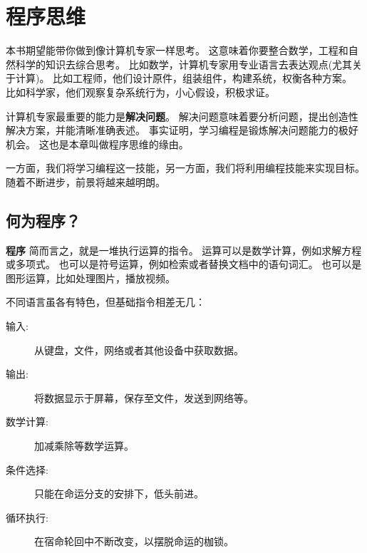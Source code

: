 \documentclass[10pt]{book}
\begin{document}
\begin{latexonly}

\tableofcontents

\clearemptydoublepage

\end{latexonly}

\mainmatter

\chapter{程序思维}

本书期望能带你做到像计算机专家一样思考。
这意味着你要整合数学，工程和自然科学的知识去综合思考。
比如数学，计算机专家用专业语言去表达观点(尤其关于计算)。
比如工程师，他们设计原件，组装组件，构建系统，权衡各种方案。
比如科学家，他们观察复杂系统行为，小心假设，积极求证。

计算机专家最重要的能力是{\bf 解决问题}。
解决问题意味着要分析问题，提出创造性解决方案，并能清晰准确表述。
事实证明，学习编程是锻炼解决问题能力的极好机会。
这也是本章叫做程序思维的缘由。
 
一方面，我们将学习编程这一技能，另一方面，我们将利用编程技能来实现目标。
随着不断进步，前景将越来越明朗。

\section{何为程序？}

{\bf 程序} 简而言之，就是一堆执行运算的指令。
运算可以是数学计算，例如求解方程或多项式。
也可以是符号运算，例如检索或者替换文档中的语句词汇。
也可以是图形运算，比如处理图片，播放视频。

不同语言虽各有特色，但基础指令相差无几：

\begin{description}

\item[输入:] 从键盘，文件，网络或者其他设备中获取数据。

\item[输出:] 将数据显示于屏幕，保存至文件，发送到网络等。

\item[数学计算:] 加减乘除等数学运算。

\item[条件选择:] 只能在命运分支的安排下，低头前进。

\item[循环执行:] 在宿命轮回中不断改变，以摆脱命运的枷锁。

\end{description}
\end{document}
